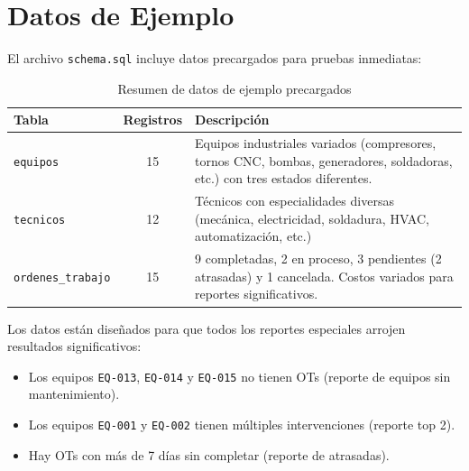 \documentclass[12pt, a4paper]{article}
\begin{document}
\newpage
\section{Datos de Ejemplo}

El archivo \texttt{schema.sql} incluye datos precargados para pruebas inmediatas:

\begin{table}[H]
    \centering
    \begin{tabularx}{\textwidth}{l c X}
        \toprule
        \textbf{Tabla} & \textbf{Registros} & \textbf{Descripción} \\
        \midrule
        \texttt{equipos} & 15 & Equipos industriales variados (compresores, tornos CNC, bombas, generadores, soldadoras, etc.) con tres estados diferentes. \\
        \addlinespace
        \texttt{tecnicos} & 12 & Técnicos con especialidades diversas (mecánica, electricidad, soldadura, HVAC, automatización, etc.) \\
        \addlinespace
        \texttt{ordenes\_trabajo} & 15 & 9 completadas, 2 en proceso, 3 pendientes (2 atrasadas) y 1 cancelada. Costos variados para reportes significativos. \\
        \bottomrule
    \end{tabularx}
    \caption{Resumen de datos de ejemplo precargados}
\end{table}

Los datos están diseñados para que todos los reportes especiales arrojen resultados significativos:
\begin{itemize}[leftmargin=2em]
    \item Los equipos \texttt{EQ-013}, \texttt{EQ-014} y \texttt{EQ-015} no tienen OTs (reporte de equipos sin mantenimiento).
    \item Los equipos \texttt{EQ-001} y \texttt{EQ-002} tienen múltiples intervenciones (reporte top 2).
    \item Hay OTs con más de 7 días sin completar (reporte de atrasadas).
\end{itemize}
\end{document}
